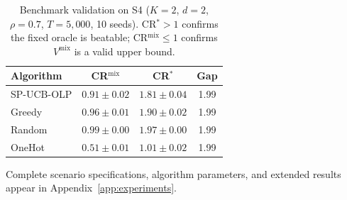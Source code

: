 \documentclass[11pt]{article}
\newcommand{\ba}{\mathbf{a}}
\begin{document}
\begin{table}[t]
\centering
\small
\caption{Benchmark validation on S4 ($K=2$, $d=2$, $\rho=0.7$, $T=5{,}000$, 10 seeds). CR$^* > 1$ confirms the fixed oracle is beatable; CR$^{\mathrm{mix}} \le 1$ confirms $V^{\mathrm{mix}}$ is a valid upper bound.}
\label{tab:complementarity}
\begin{tabular}{lccc}
\toprule
Algorithm & CR$^{\mathrm{mix}}$ & CR$^*$ & Gap \\
\midrule
SP-UCB-OLP & $0.91 \pm 0.02$ & $1.81 \pm 0.04$ & 1.99 \\
Greedy & $0.96 \pm 0.01$ & $1.90 \pm 0.02$ & 1.99 \\
Random & $0.99 \pm 0.00$ & $1.97 \pm 0.00$ & 1.99 \\
OneHot & $0.51 \pm 0.01$ & $1.01 \pm 0.02$ & 1.99 \\
\bottomrule
\end{tabular}
\end{table}

Complete scenario specifications, algorithm parameters, and extended results appear in Appendix~\ref{app:experiments}.


\end{document}
